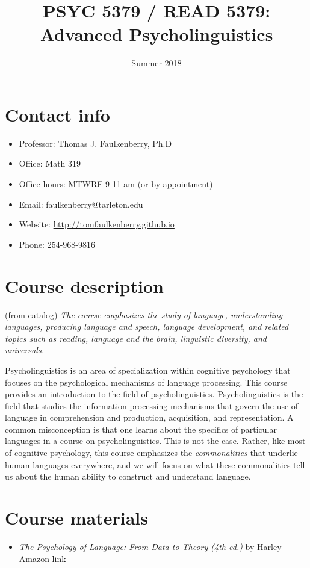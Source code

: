 \documentclass[10pt]{article}
\date{Summer 2018}
\title{PSYC 5379 / READ 5379: Advanced Psycholinguistics}
\begin{document}
\maketitle

\section*{Contact info}
\label{sec-1}
\begin{itemize}
\item Professor: Thomas J. Faulkenberry, Ph.D
\item Office: Math 319
\item Office hours: MTWRF 9-11 am (or by appointment)
\item Email: faulkenberry@tarleton.edu
\item Website: \url{http://tomfaulkenberry.github.io}
\item Phone: 254-968-9816
\end{itemize}

\section*{Course description}
\label{sec-2}

(from catalog) \emph{The course emphasizes the study of language, understanding languages, producing language and speech, language development, and related topics such as reading, language and the brain, linguistic diversity, and universals.}

Psycholinguistics is an area of specialization within cognitive psychology that focuses on the psychological mechanisms of language processing.  This course provides an introduction to the field of psycholinguistics. Psycholinguistics is the field that studies the information processing mechanisms that govern the use of language in comprehension and production, acquisition, and representation.  A common misconception is that one learns about the specifics of particular languages in a course on psycholinguistics.  This is not the case.  Rather, like most of cognitive psychology, this course emphasizes the \emph{commonalities} that underlie human languages everywhere, and we will focus on what these commonalities tell us about the human ability to construct and understand language. 

\section*{Course materials}
\label{sec-3}
\begin{itemize}
\item \emph{The Psychology of Language: From Data to Theory (4th ed.)} by Harley \href{https://www.amazon.com/Psychology-Language-Data-Theory/dp/1848720890}{Amazon link}
\end{itemize}
\end{document}
